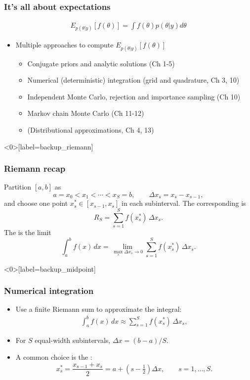 \documentclass[10pt]{beamer}
\begin{document}
\begin{frame}


\frametitle{It's all about expectations}

   \begin{align*}
   E_{p(\theta|y)}[f(\theta)] = \int f(\theta) p(\theta|y) d\theta
   \end{align*}

  \begin{itemize}
  \item Multiple approaches to compute $E_{p(\theta|y)}[f(\theta)]$
  \begin{itemize}
  \item Conjugate priors and analytic solutions (Ch 1-5)
  \pause
  \item Numerical (deterministic) integration (grid and quadrature, Ch 3, 10)
  \pause
  \item Independent Monte Carlo, rejection and importance sampling (Ch 10)
  \pause
  \item Markov chain Monte Carlo (Ch 11-12)
  \pause
  \item (Distributional approximations, Ch 4, 13)
  \end{itemize}
  \end{itemize}

 \end{frame}

\begin{frame}<0>[label=backup_riemann]
\frametitle{Riemann recap}

  Partition $[a,b]$ as
  \[
    a=x_0<x_1<\cdots<x_S=b,
    \qquad \Delta x_s=x_s-x_{s-1},
  \]
  and choose one point $x_s^*\in[x_{s-1},x_s]$ in each subinterval.
  The corresponding  is
  \[
    R_S=\sum_{s=1}^{S} f(x_s^*)\,\Delta x_s.
  \]
  \pause
  The  is the limit
  \[
    \int_a^b f(x)\,dx
    =\lim_{\max_s \Delta x_s\to 0}
      \sum_{s=1}^{S} f(x_s^*)\,\Delta x_s.
  \]


\end{frame}

\begin{frame}<0>[label=backup_midpoint]
\frametitle{Numerical integration}


  \begin{itemize}
    \item Use a finite Riemann sum to approximate the integral:
    \pause
    \begin{align*}
         {\displaystyle \int _{a}^{b}f(x)\,dx \approx \sum _{s=1}^{S}f(x_{s}^{*})\,\Delta x_{s},}
    \end{align*}
    \item For $S$ equal-width subintervals,
      $\Delta x=(b-a)/S$.
    \item A common choice is the :
    \[
      x_s^* = \frac{x_{s-1}+x_s}{2}
      = a + \left(s-\tfrac{1}{2}\right)\Delta x,
      \qquad s=1,\ldots,S.
    \]

  \end{itemize}

\end{frame}
\end{document}
